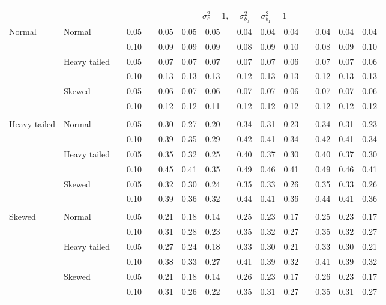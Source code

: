 \documentclass{article} %
\begin{document}
\begin{table}[ht]
\begin{scriptsize}
\begin{center}
\begin{tabular}{ll p{.1cm} c p{.1cm} rrr p{.1cm} rrr p{.1cm} rrr}
&&&&&&&&&&&&&&&\\
& && && \multicolumn{9}{c}{$\sigma_{\varepsilon}^2 = 1$, \ \ $\sigma_{b_0}^2 = \sigma_{b_1}^2 = 1$} \\ \cline{6-16}
\rowcolor{gray!20}Normal       & Normal       && 0.05 &&   0.05 & 0.05 & 0.05 && 0.04 & 0.04 & 0.04 && 0.04 & 0.04 & 0.04 \\ 
\rowcolor{gray!20}             &              && 0.10 &&   0.09 & 0.09 & 0.09 && 0.08 & 0.09 & 0.10 && 0.08 & 0.09 & 0.10 \\ 
\rowcolor{gray!20}             & Heavy tailed && 0.05 &&   0.07 & 0.07 & 0.07 && 0.07 & 0.07 & 0.06 && 0.07 & 0.07 & 0.06 \\ 
\rowcolor{gray!20}             &              && 0.10 &&   0.13 & 0.13 & 0.13 && 0.12 & 0.13 & 0.13 && 0.12 & 0.13 & 0.13 \\ 
\rowcolor{gray!20}             & Skewed       && 0.05 &&   0.06 & 0.07 & 0.06 && 0.07 & 0.07 & 0.06 && 0.07 & 0.07 & 0.06 \\ 
\rowcolor{gray!20}             &              && 0.10 &&   0.12 & 0.12 & 0.11 && 0.12 & 0.12 & 0.12 && 0.12 & 0.12 & 0.12 \\ 
             &&&&&&&&&&&&&&&\\
Heavy tailed & Normal       && 0.05 &&   0.30 & 0.27 & 0.20 && 0.34 & 0.31 & 0.23 && 0.34 & 0.31 & 0.23 \\ 
             &              && 0.10 &&   0.39 & 0.35 & 0.29 && 0.42 & 0.41 & 0.34 && 0.42 & 0.41 & 0.34 \\ 
             & Heavy tailed && 0.05 &&   0.35 & 0.32 & 0.25 && 0.40 & 0.37 & 0.30 && 0.40 & 0.37 & 0.30 \\ 
             &              && 0.10 &&   0.45 & 0.41 & 0.35 && 0.49 & 0.46 & 0.41 && 0.49 & 0.46 & 0.41 \\ 
             & Skewed       && 0.05 &&   0.32 & 0.30 & 0.24 && 0.35 & 0.33 & 0.26 && 0.35 & 0.33 & 0.26 \\ 
             &              && 0.10 &&   0.39 & 0.36 & 0.32 && 0.44 & 0.41 & 0.36 && 0.44 & 0.41 & 0.36 \\ 
             &&&&&&&&&&&&&&&\\
Skewed       & Normal       && 0.05 &&   0.21 & 0.18 & 0.14 && 0.25 & 0.23 & 0.17 && 0.25 & 0.23 & 0.17 \\ 
             &              && 0.10 &&   0.31 & 0.28 & 0.23 && 0.35 & 0.32 & 0.27 && 0.35 & 0.32 & 0.27 \\ 
             & Heavy tailed && 0.05 &&   0.27 & 0.24 & 0.18 && 0.33 & 0.30 & 0.21 && 0.33 & 0.30 & 0.21 \\ 
             &              && 0.10 &&   0.38 & 0.33 & 0.27 && 0.41 & 0.39 & 0.32 && 0.41 & 0.39 & 0.32 \\ 
             & Skewed       && 0.05 &&   0.21 & 0.18 & 0.14 && 0.26 & 0.23 & 0.17 && 0.26 & 0.23 & 0.17 \\ 
             &              && 0.10 &&   0.31 & 0.26 & 0.22 && 0.35 & 0.31 & 0.27 && 0.35 & 0.31 & 0.27 \\ 


\end{tabular}
\end{center}
\end{scriptsize}
\end{table}
\end{document}

